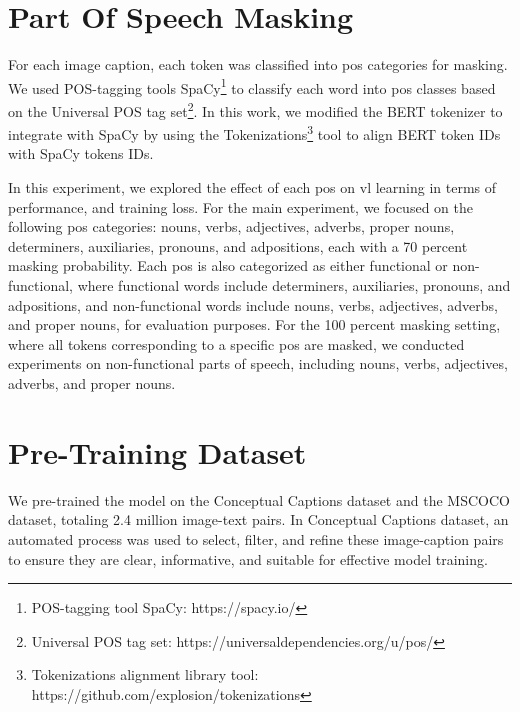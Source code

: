 \section{Part Of Speech Masking}
For each image caption, each token was classified into \acrshort{pos} categories for masking.  
We used POS-tagging tools SpaCy\footnote{POS-tagging tool SpaCy: https://spacy.io/} to classify each word into \acrshort{pos} classes based on the Universal POS tag set\footnote{Universal POS tag set: https://universaldependencies.org/u/pos/}.
In this work, we modified the BERT tokenizer to integrate with SpaCy by using the Tokenizations\footnote{Tokenizations alignment library tool: https://github.com/explosion/tokenizations} tool to align BERT token IDs with SpaCy tokens IDs.

In this experiment, we explored the effect of each \acrshort{pos} on \acrshort{vl} learning in terms of performance, and training loss.  
For the main experiment, we focused on the following \acrshort{pos} categories: nouns, verbs, adjectives, adverbs, proper nouns, determiners, auxiliaries, pronouns, and adpositions, each with a 70 percent masking probability.
Each \acrshort{pos} is also categorized as either functional or non-functional, where functional words include determiners, auxiliaries, pronouns, and adpositions, and non-functional words include nouns, verbs, adjectives, adverbs, and proper nouns, for evaluation purposes.
For the 100 percent masking setting, where all tokens corresponding to a specific \acrshort{pos} are masked, we conducted experiments on non-functional parts of speech, including nouns, verbs, adjectives, adverbs, and proper nouns.


\section{Pre-Training Dataset}
We pre-trained the model on the Conceptual Captions dataset \cite{conceptual-caption} and the MSCOCO dataset, totaling 2.4 million image-text pairs.
In Conceptual Captions dataset, an automated process was used to select, filter, and refine these image-caption pairs to ensure they are clear, informative, and suitable for effective model training.


